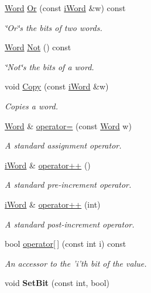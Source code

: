 \begin{DoxyCompactItemize}
\hyperlink{classWord}{Word} \hyperlink{classWord_a681da292897265ae47f144a99d49d9ec}{Or} (const \hyperlink{classiWord}{iWord} \&w) const 
\begin{DoxyCompactList}\small\item\em \char`\"{}Or\char`\"{}s the bits of two words. \item\end{DoxyCompactList}\item 
\hyperlink{classWord}{Word} \hyperlink{classWord_afdecfa9e3f2fda36496f249617a4cef5}{Not} () const 
\begin{DoxyCompactList}\small\item\em \char`\"{}Not\char`\"{}s the bits of a word. \item\end{DoxyCompactList}\item 
void \hyperlink{classWord_a8c094d866fe9af5da5d32c98430a86f8}{Copy} (const \hyperlink{classiWord}{iWord} \&w)
\begin{DoxyCompactList}\small\item\em Copies a word. \item\end{DoxyCompactList}\item 
\hyperlink{classWord}{Word} \& \hyperlink{classWord_a4cbab3635971c12fdb2bf37d2603e36e}{operator=} (const \hyperlink{classWord}{Word} w)
\begin{DoxyCompactList}\small\item\em A standard assignment operator. \item\end{DoxyCompactList}\item 
\hyperlink{classiWord}{iWord} \& \hyperlink{classWord_a8641e9e5139b8f5bfbc52ab2557d8f9a}{operator++} ()
\begin{DoxyCompactList}\small\item\em A standard pre-\/increment operator. \item\end{DoxyCompactList}\item 
\hyperlink{classiWord}{iWord} \& \hyperlink{classWord_aba1bb3e72c1262cc69d74b971d3bc7ee}{operator++} (int)
\begin{DoxyCompactList}\small\item\em A standard post-\/increment operator. \item\end{DoxyCompactList}\item 
bool \hyperlink{classWord_a0b08a81ced05b38d3d719ef70ecb3215}{operator\mbox{[}$\,$\mbox{]}} (const int i) const 
\begin{DoxyCompactList}\small\item\em An accessor to the 'i'th bit of the value. \item\end{DoxyCompactList}\item 
\hypertarget{classWord_a8449f26fb840ca22dcc2ba3fc816d068}{
void {\bfseries SetBit} (const int, bool)}
\label{classWord_a8449f26fb840ca22dcc2ba3fc816d068}

\end{DoxyCompactItemize}
